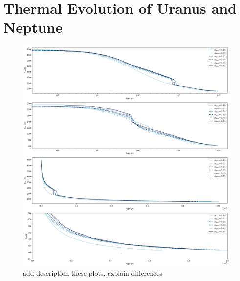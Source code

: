 \documentclass[11pt]{ucscthesisbs}
\begin{document}
\section{Thermal Evolution of Uranus and Neptune}


\begin{figure}[ht]
 \centerline{
  \includegraphics[scale=0.5]{figures/u_cooling_curves_nz_4096_more_qdeeps.png}
 }
\caption[Inhibition of convection on Uranus]
{add description these plots. explain differences}
\label{fig:radiative}
\end{figure}
\end{document}
